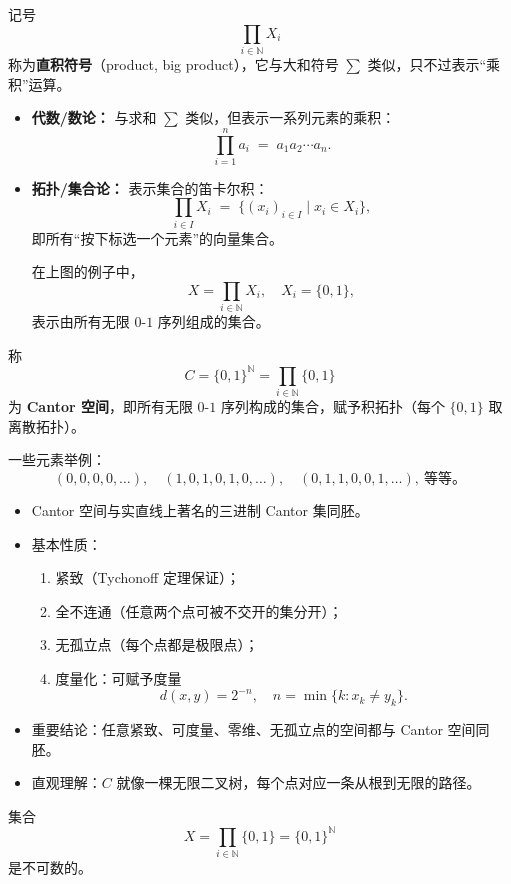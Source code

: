 \begin{proposition}[直积符号]
    记号
\[
\prod_{i \in \mathbb{N}} X_i
\]
称为\textbf{直积符号}（product, big product），它与大和符号 $\sum$ 类似，只不过表示“乘积”运算。

\begin{itemize}
  \item \textbf{代数/数论：}  
  与求和 $\sum$ 类似，但表示一系列元素的乘积：
  \[
  \prod_{i=1}^n a_i \;=\; a_1 a_2 \cdots a_n.
  \]

  \item \textbf{拓扑/集合论：}  
  表示集合的笛卡尔积：
  \[
  \prod_{i \in I} X_i \;=\; \{ (x_i)_{i \in I} \mid x_i \in X_i \},
  \]
  即所有“按下标选一个元素”的向量集合。  

  在上图的例子中，
  \[
  X = \prod_{i \in \mathbb{N}} X_i, \quad X_i = \{0,1\},
  \]
  表示由所有无限 $0$-$1$ 序列组成的集合。
\end{itemize}
\end{proposition}
\begin{definition}[Cantor 空间]
称
\[
C = \{0,1\}^{\mathbb{N}} = \prod_{i \in \mathbb{N}} \{0,1\}
\]
为 \textbf{Cantor 空间}，即所有无限 $0$-$1$ 序列构成的集合，赋予积拓扑（每个 $\{0,1\}$ 取离散拓扑）。
\end{definition}
一些元素举例：
\[
(0,0,0,0,\dots),\quad
(1,0,1,0,1,0,\dots),\quad
(0,1,1,0,0,1,\dots),\ \text{等等。}
\]
\begin{dxtips}[补充说明]
\begin{itemize}
  \item Cantor 空间与实直线上著名的三进制 Cantor 集同胚。
  \item 基本性质：
    \begin{enumerate}
      \item 紧致（Tychonoff 定理保证）；
      \item 全不连通（任意两个点可被不交开的集分开）；
      \item 无孤立点（每个点都是极限点）；
      \item 度量化：可赋予度量
      \[
      d(x,y) = 2^{-n}, \quad n = \min\{k : x_k \neq y_k\}.
      \]
    \end{enumerate}
  \item 重要结论：任意紧致、可度量、零维、无孤立点的空间都与 Cantor 空间同胚。
  \item 直观理解：$C$ 就像一棵无限二叉树，每个点对应一条从根到无限的路径。
\end{itemize}
\end{dxtips}
\begin{proposition}
集合
\[
X = \prod_{i \in \mathbb{N}} \{0,1\} = \{0,1\}^{\mathbb{N}}
\]
是不可数的。
\end{proposition}

